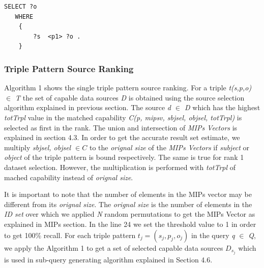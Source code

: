 \documentclass{sig-alternate}  %
\begin{document}
\begin{lstlisting}[caption = {A single triple pattern query},basicstyle={\tiny},frame = {single},stringstyle={\ttfamily}]
 SELECT ?o
   WHERE
    {
        ?s  <p1> ?o .
    }
\end{lstlisting}

\subsubsection{Triple Pattern Source Ranking}
Algorithm 1 shows the single triple pattern source ranking. For a triple \emph{t(s,p,o) $\in$ T } the set of capable data sources \emph{D} is obtained using the source selection algorithm explained in previous section. The source \emph{d $\in$ D} which has the highest \emph{totTrpl} value in the matched capability \emph{C(p, mipsv, sbjsel, objsel, totTrpl)} is selected as first in the rank. The union and intersection of \emph{MIPs Vectors} is explained in section 4.3. In order to get the accurate result set estimate, we multiply \emph{sbjsel, objsel $\in C$} to the \emph{orignal size} of the \emph{MIPs Vectors} if \emph{subject} or \emph{object} of the triple pattern is bound respectively. The same is true for rank 1 dataset selection. However, the multiplication is performed with \emph{totTrpl} of mached capability instead of \emph{orignal size}. 

It is important to note that the number of elements in the MIPs vector may be different from its \emph{orignal size}. The \emph{orignal size} is the number of elements in the \emph{ID set} over which we applied \emph{N} random permutations to get the MIPs Vector as explained in MIPs section. In the line 24 we set the threshold value to 1 in order to get 100\% recall. For each triple pattern $t_j = (s_j, p_j, o_j)$ in the query \emph{q} $\in$ \emph{Q}, we apply the Algorithm 1 to get a set of selected capable data sources \emph{$D_{s_j}$} which is used in sub-query generating algorithm explained in Section 4.6.
\end{document}
